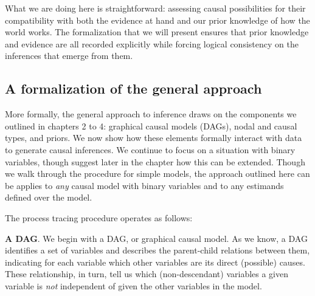 \documentclass[
  12pt,
]{book}
\begin{document}
What we are doing here is straightforward: assessing causal possibilities for their compatibility with both the evidence at hand and our prior knowledge of how the world works. The formalization that we will present ensures that prior knowledge and evidence are all recorded explicitly while forcing logical consistency on the inferences that emerge from them.

\hypertarget{a-formalization-of-the-general-approach}{%
\subsection{A formalization of the general approach}\label{a-formalization-of-the-general-approach}}

More formally, the general approach to inference draws on the components we outlined in chapters 2 to 4: graphical causal models (DAGs), nodal and causal types, and priors. We now show how these elements formally interact with data to generate causal inferences. We continue to focus on a situation with binary variables, though suggest later in the chapter how this can be extended. Though we walk through the procedure for simple models, the approach outlined here can be applies to \emph{any} causal model with binary variables and to any estimands defined over the model.

The process tracing procedure operates as follows:

\textbf{A DAG}. We begin with a DAG, or graphical causal model. As we know, a DAG identifies a set of variables and describes the parent-child relations between them, indicating for each variable which other variables are its direct (possible) causes. These relationship, in turn, tell us which (non-descendant) variables a given variable is \emph{not} independent of given the other variables in the model.
\end{document}
